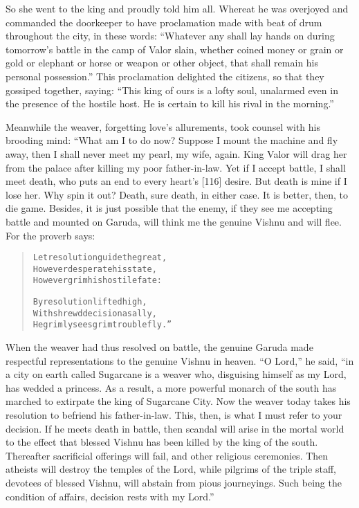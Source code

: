 \documentclass[article, twoside, 14pt]{memoir}
\renewenvironment{verbatim}{%
\begin{quote}%
\vskip -10pt%
\begin{alltt}\normalfont\large}{\end{alltt}%
\end{quote}%
\vskip -10pt
} %
\begin{document}
So she went to the king and proudly told him all. Whereat he was
overjoyed and commanded the doorkeeper to have proclamation made
with beat of drum throughout the city, in these words:
``Whatever any shall lay hands on during tomorrow's battle in the camp of Valor slain, whether coined money or grain or gold or elephant or horse or weapon or other object, that shall remain his personal possession.''
This proclamation delighted the citizens, so that they gossiped
together, saying:
``This king of ours is a lofty soul, unalarmed even in the presence of the hostile host. He is certain to kill his rival in the morning.''

Meanwhile the weaver, forgetting love's allurements, took counsel
with his brooding mind: “What am I to do now? Suppose I mount the
machine and fly away, then I shall never meet my pearl, my wife,
again. King Valor will drag her from the palace after killing my
poor father-in-law. Yet if I accept battle, I shall meet death, who
puts an end to every heart's [116] desire. But death is mine if I
lose her. Why spin it out? Death, sure death, in either case. It is
better, then, to die game. Besides, it is just possible that the
enemy, if they see me accepting battle and mounted on Garuda, will
think me the genuine Vishnu and will flee. For the proverb says:

\begin{verbatim}
Let resolution guide the great,
However desperate his state,
However grim his hostile fate:

By resolution lifted high,
With shrewd decision as ally,
He grimly sees grim trouble fly.”
\end{verbatim}
When the weaver had thus resolved on battle, the genuine Garuda
made respectful representations to the genuine Vishnu in heaven.
``O Lord,'' he said,
``in a city on earth called Sugarcane is a weaver who, disguising himself as my Lord, has wedded a princess. As a result, a more powerful monarch of the south has marched to extirpate the king of Sugarcane City. Now the weaver today takes his resolution to befriend his father-in-law. This, then, is what I must refer to your decision. If he meets death in battle, then scandal will arise in the mortal world to the effect that blessed Vishnu has been killed by the king of the south. Thereafter sacrificial offerings will fail, and other religious ceremonies. Then atheists will destroy the temples of the Lord, while pilgrims of the triple staff, devotees of blessed Vishnu, will abstain from pious journeyings. Such being the condition of affairs, decision rests with my Lord.''
\end{document}
